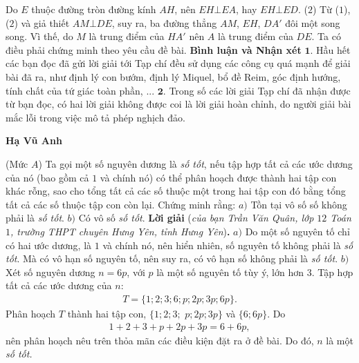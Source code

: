 \begin{multicols}{2}
	\vskip 0.05cm
	Do $E$ thuộc đường tròn đường kính $AH$, nên $EH \bot EA$, hay $EH \bot ED$. \hfill                                                ($2$)
	\vskip 0.05cm
	Từ ($1$), ($2$) và giả thiết $AM \bot DE$, suy ra, ba đường thẳng $AM$, $EH$, $DA'$  đôi một song song. Vì thế, do $M$ là trung điểm của $HA'$  nên $A$ là trung điểm của $DE$. Ta có điều phải chứng minh theo yêu cầu đề bài.
	\vskip 0.05cm
	\columnbreak
	\textbf{\color{thachthuctoanhoc}Bình luận và Nhận xét}
	\vskip 0.05cm
	$\pmb{1.}$ Hầu hết các bạn đọc đã gửi lời giải tới Tạp chí đều sử dụng các công cụ quá mạnh để giải bài đã ra, như định lý con bướm, định lý \linebreak Miquel, bổ đề Reim, góc định hướng, tính chất của tứ giác toàn phần, ...
	\vskip 0.05cm
	$\pmb{2.}$ Trong số các lời giải Tạp chí đã nhận được từ bạn đọc, có hai lời giải không được coi là lời giải hoàn chỉnh, do người giải bài mắc lỗi trong việc mô tả phép nghịch đảo.
	\begin{flushright}
		\textbf{\color{thachthuctoanhoc}Hạ Vũ Anh}
	\end{flushright}
	{}
	(Mức $A$) Ta gọi một số nguyên dương là \textit{số tốt}, nếu tập hợp tất cả các ước dương của nó (bao gồm cả $1$ và chính nó) có thể phân hoạch được thành hai tập con khác rỗng, sao cho tổng tất cả các số thuộc một trong hai tập con đó bằng tổng tất cả các số thuộc tập con còn lại. Chứng minh rằng:
	\vskip 0.05cm
	$a)$ Tồn tại vô số số không phải là \textit{số tốt}.
	\vskip 0.05cm
	$b)$ Có vô số \textit{số tốt}.
	\vskip 0.05cm
	\textbf{\color{thachthuctoanhoc}Lời giải} (\textit{của bạn Trần Văn Quân, lớp $12$ Toán $1$, trường THPT chuyên Hưng Yên, tỉnh Hưng Yên})\textbf{\color{thachthuctoanhoc}.}
	\vskip 0.05cm
	$a)$ Do một số nguyên tố chỉ có hai ước dương, là $1$ và chính nó, nên hiển nhiên, số nguyên tố không phải là \textit{số tốt}. Mà có vô hạn số nguyên tố, nên suy ra, có vô hạn số không phải là \textit{số tốt}.
	\vskip 0.05cm
	$b)$ Xét số nguyên dương $n = 6p$, với $p$ là một số nguyên tố tùy ý, lớn hơn $3$.
	\vskip 0.05cm
	Tập hợp tất cả các ước dương của $n$:
	\begin{align*}
		T = \{1; 2; 3; 6; p; 2p; 3p; 6p\}.
	\end{align*}
	Phân hoạch $T$ thành hai tập con, $\{1; 2; 3;$ $p; 2p; 3p\}$ và $\{6; 6p\}$.
	Do
	\begin{align*}
		1 + 2 + 3 + p + 2p + 3p = 6 + 6p,
	\end{align*}
	nên phân hoạch nêu trên thỏa mãn các điều kiện đặt ra ở đề bài. Do đó, $n$ là một \textit{số tốt.}

\end{multicols}
